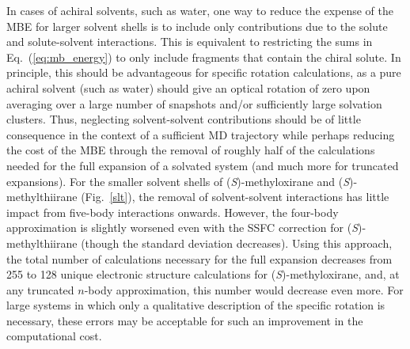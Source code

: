         In cases of achiral solvents, such as water, one way to reduce the expense of the MBE for larger solvent shells is to include only contributions due to the solute and solute-solvent interactions. This is equivalent to restricting the sums in Eq.~(\ref{eq:mb_energy}) to only include fragments that contain the chiral solute. In principle, this should be advantageous for specific rotation calculations, as a pure achiral solvent (such as water) should give an optical rotation of zero upon averaging over a large number of snapshots and/or sufficiently large solvation clusters. Thus, neglecting solvent-solvent contributions should be of little consequence in the context of a sufficient MD trajectory while perhaps reducing the cost of the MBE through the removal of roughly half of the calculations needed for the full expansion of a solvated system (and much more for truncated expansions). For the smaller solvent shells of (\textit{S})-methyloxirane and (\textit{S})-methylthiirane (Fig.~\ref{slt}), the removal of solvent-solvent interactions has little impact from five-body interactions onwards.  However, the four-body approximation is slightly worsened even with the SSFC correction for (\textit{S})-methylthiirane (though the standard deviation decreases). Using this approach, the total number of calculations necessary for the full expansion decreases from 255 to 128 unique electronic structure calculations for (\textit{S})-methyloxirane, and, at any truncated $n$-body approximation, this number would decrease even more.  For large systems in which only a qualitative description of the specific rotation is necessary, these errors may be acceptable for such an improvement in the computational cost.


